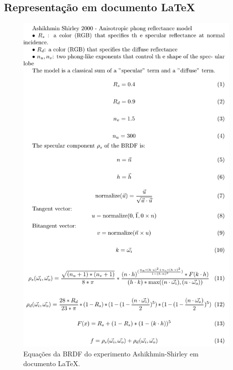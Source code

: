 \subsection{Representação em documento \LaTeX{}}
\begin{figure}[H]
    \caption{\label{fig-ashikhmin-shirley-close-to-original-eqlang-latex}
    \small Equações da BRDF do experimento Ashikhmin-Shirley em documento \LaTeX{}.}
    \begin{center}
        \includegraphics[scale=0.92]{./Imagens/brdfs/ashikhmin-shirley-close-to-original.pdf}
    \end{center}
\end{figure}


